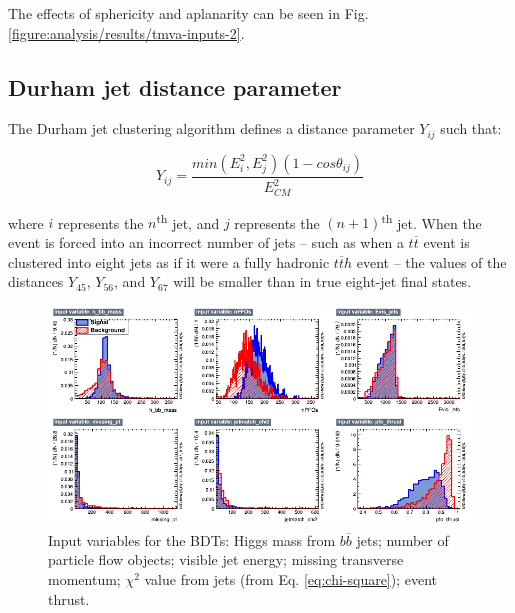 The effects of sphericity and aplanarity can be seen in Fig. \ref{figure:analysis/results/tmva-inputs-2}.

\subsection{Durham jet distance parameter}
\label{section:durham-distance}
The Durham jet clustering algorithm defines a distance parameter $Y_{ij}$ such that:

\begin{equation}
	Y_{ij} = \frac{min(E_i^2 , E_j^2)(1-cos\theta_{ij})}{E^2_{CM}}
\label{eq:durham-distance}
\end{equation}

where $i$ represents the $n$\textsuperscript{th} jet, and $j$ represents the $(n+1)$\textsuperscript{th} jet. When the event is forced into an incorrect number of jets -- such as when a $t\overline{t}$ event is clustered into eight jets as if it were a fully hadronic $t\overline{t}h$ event -- the values of the distances $Y_{45}$, $Y_{56}$, and $Y_{67}$ will be smaller than in true eight-jet final states. \\

\begin{figure}[p]
	\centering
	\includegraphics[width=1.0\textwidth]{../Pictures/Analysis/BDTs/variables_id_c1.png}
	\caption{Input variables for the BDTs: Higgs mass from $b\overline{b}$ jets; number of particle flow objects; visible jet energy; missing transverse momentum; $\chi^2$ value from jets (from Eq. \ref{eq:chi-square}); event thrust.}
	\label{figure:analysis/results/tmva-inputs-1}
\end{figure}

